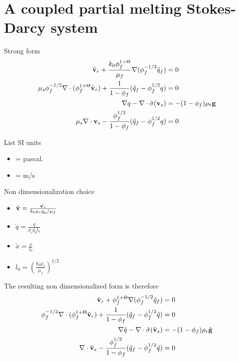 
\section{A coupled partial melting Stokes-Darcy system}
Strong form
\begin{equation}
\begin{aligned}
		  \tilde{\bold{v}}_r + \frac{k_0 \phi_f^{1+\Theta}}{\mu_f} \nabla (\phi_f^{-1/2}\tilde{q}_f) &= 0 \\
		  \mu_s\phi_f^{-1/2}\nabla\cdot(\phi_f^{1+\Theta}\tilde{\bold{v}}_r) + \frac{1}{1-\phi_f}(\tilde{q}_f - \phi_f^{1/2}q) &=0\\
		  \nabla q - \nabla \cdot \hat{\sigma}(\bold{v}_s) &= -(1-\phi_f)\rho_r \bold{g} \\
		  \mu_s \nabla \cdot \bold{v}_s - \frac{\phi_f^{1/2}}{1-\phi_f}(\tilde{q}_f - \phi_f^{1/2}q) &=0
\end{aligned}
\end{equation}

List SI units

\begin{itemize}
		  \item [q] = pascal.
		  \item [$\bold{v}$] = m/s
\end{itemize}

Non dimensionalization choice
\begin{itemize}
		  \item $\check{\bold{v}} = \frac{\tilde{\bold{v}_r}}{k_0 \rho_r g_y/\mu_f}$
					 \item $\check{q} = \frac{q}{\rho_r g_y l_0 }$
					 \item $\check{x} = \frac{x}{l_0}$
					 \item $l_0 = (\frac{k_0 \mu_s}{\mu_f})^{1/2}$
\end{itemize}

The resulting non dimensionalized form is therefore
\begin{equation}
		  \begin{aligned}
					 \check{\bold{v}}_r + \phi_f^{1+\Theta}\nabla (\phi_f^{-1/2}\check{q}_f) &= 0\\
					 \phi_f^{-1/2}\nabla \cdot (\phi_f^{1+\Theta} \check{\bold{v}}_r) + \frac{1}{1-\phi_f}(\check{q}_f - \phi_f^{1/2}\check{q}) &=0 \\
					 \nabla \check{q} - \nabla \cdot \hat{\sigma}(\check{\bold{v}}_s) &= -(1-\phi_f)\rho_r \hat{\bold{g}} \\
					 \nabla \cdot \check{\bold{v}}_s - \frac{\phi_f^{1/2}}{1-\phi_f}(\check{q}_f - \phi_f^{1/2}\check{q}) &= 0
		  \end{aligned}
\end{equation}

